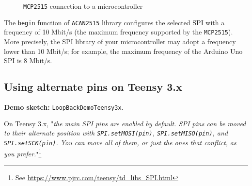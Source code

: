 \documentclass[10pt, a4paper, obeyspaces]{extarticle}
\newcommand \subsectionLabel[2]{\subsection{#1}\label{subsec:#2}}
\newcommand\labelFigure[1]{\label{fig:#1}}
\begin{document}
\begin{figure}[!ht]
  \small
  \centering
  \caption{\texttt{MCP2515} connection to a microcontroller}
  \labelFigure{figureHardwareSPI}
\end{figure}


The \texttt{begin} function of \texttt{ACAN2515} library configures the selected SPI with a frequency of 10 Mbit/s (the maximum frequency supported by the \texttt{MCP2515}). More precisely, the SPI library of your microcontroller may adopt a frequency lower than 10 Mbit/s; for example, the maximum frequency of the Arduino Uno SPI is 8 Mbit/s.




\subsectionLabel{Using alternate pins on Teensy 3.x}{TeensyAlternatePins}

{\bf Demo sketch: } \texttt{LoopBackDemoTeensy3x}.

On Teensy 3.x, "\emph{the main SPI pins are enabled by default. SPI pins can be moved to their alternate position with \texttt{SPI.setMOSI(pin)}, \texttt{SPI.setMISO(pin)}, and \texttt{SPI.setSCK(pin)}. You can move all of them, or just the ones that conflict, as you prefer.}"\footnote{See \url{https://www.pjrc.com/teensy/td_libs_SPI.html}}
\end{document}
